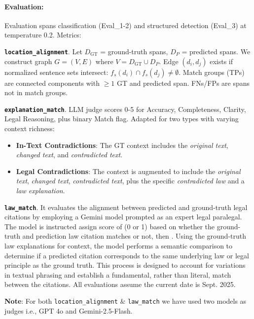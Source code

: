 \documentclass[11pt]{article}
\begin{document}
\paragraph{Evaluation:} Evaluation spans classification (Eval\_1-2) and structured detection (Eval\_3) at temperature 0.2. Metrics:

\texttt{\textbf{location\_alignment}}. Let $D_{\text{GT}}$ = ground-truth spans, $D_P$ = predicted spans. We construct graph $G = (V, E)$ where $V = D_{\text{GT}} \cup D_P$. Edge $(d_i, d_j)$ exists if normalized sentence sets intersect: $f_s(d_i) \cap f_s(d_j) \neq \emptyset$. Match groups (TPs) are connected components with $\geq 1$ GT and predicted span. FNs/FPs are spans not in match groups.

\texttt{\textbf{explanation\_match}}. LLM judge scores 0-5 for Accuracy, Completeness, Clarity, Legal Reasoning, plus binary Match flag. Adapted for two types with varying context richness:

\begin{itemize}
    \item \textbf{In-Text Contradictions}: The GT context includes the \textit{original text}, \textit{changed text}, and \textit{contradicted text}.

    \item \textbf{Legal Contradictions}: The context is augmented to include the \textit{original text}, \textit{changed text}, \textit{contradicted text}, plus the specific \textit{contradicted law} and a \textit{law explanation}.
\end{itemize}

\texttt{\textbf{law\_match}}. It evaluates the alignment between predicted and ground-truth legal citations by employing a Gemini model prompted as an expert legal paralegal. The model is instructed assign score of (0 or 1) based on whether the ground-truth and prediction law citation matches or not, then . Using the ground-truth law explanations for context, the model performs a semantic comparison to determine if a predicted citation corresponds to the same underlying law or legal principle as the ground truth. This process is designed to account for variations in textual phrasing and establish a fundamental, rather than literal, match between the citations. All evaluations assume the current date is Sept. 2025.

\textbf{Note}: For both \texttt{location\_alignment} \& \texttt{law\_match} we have used two models as judges i.e., GPT 4o and Gemini-2.5-Flash.  
\end{document}
